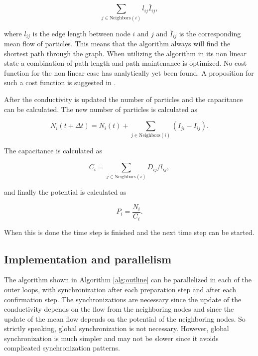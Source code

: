 \begin{equation}
\sum_{j \in \text{Neighbors}(i)} l_{ij} \bar{I}_{ij},
\end{equation}

 \noindent where $l_{ij}$ is the edge length between node $i$ and $j$ and $\bar{I}_{ij}$ is the corresponding mean flow of particles. This means that the algorithm always will find the shortest path through the graph. When utilizing the algorithm in its non linear state a combination of path length and path maintenance is optimized. No cost function for the non linear case has analytically yet been found. A proposition for such a cost function is suggested in \cite{Sumpter}. 

After the conductivity is updated the number of particles and the capacitance can be calculated. The new number of particles is calculated as

 \begin{equation}
 N_i(t + \Delta t) = N_i(t) + \sum_{j \in \text{Neighbors}(i)} \left( I_{ji} - I_{ij} \right).
 \end{equation}

 \noindent The capacitance is calculated as 

 \begin{equation}
 C_i = \sum_{j \in \text{Neighbors}(i)} D_{ij}/l_{ij},
 \end{equation}
 
 \noindent and finally the potential is calculated as
 
 \begin{equation}
 P_i = \frac{N_i}{C_i}.
 \end{equation}
 
 \noindent When this is done the time step is finished and the next time step can be started.

\subsection{Implementation and parallelism} 
\label{sec:parallel}

The algorithm shown in Algorithm \ref{alg:outline} can be parallelized in each of the outer loops, with synchronization after each preparation step and after each confirmation step. The synchronizations are necessary since the update of the conductivity depends on the flow from the neighboring nodes and since the update of the mean flow depends on the potential of the neighboring nodes. So strictly speaking, global synchronization is not necessary. However, global synchronization is much simpler and may not be slower since it avoids complicated synchronization patterns.

